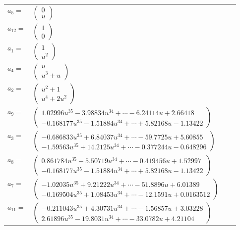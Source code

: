 \documentclass[1p]{elsarticle_modified}
\theoremstyle{definition}
\begin{document}
\begin{tabular}{m{7pt} m{180pt} m{7pt} m{180pt} }
\flushright $a_{5}=$&$\begin{pmatrix}0\\u\end{pmatrix}$ \\
\flushright $a_{12}=$&$\begin{pmatrix}1\\0\end{pmatrix}$ \\
\flushright $a_{1}=$&$\begin{pmatrix}1\\u^2\end{pmatrix}$ \\
\flushright $a_{4}=$&$\begin{pmatrix}u\\u^3+u\end{pmatrix}$ \\
\flushright $a_{2}=$&$\begin{pmatrix}u^2+1\\u^4+2 u^2\end{pmatrix}$ \\
\flushright $a_{9}=$&$\begin{pmatrix}1.02996 u^{35}-3.98834 u^{34}+\cdots-6.24114 u+2.66418\\-0.168177 u^{35}-1.51884 u^{34}+\cdots+5.82168 u-1.13422\end{pmatrix}$ \\
\flushright $a_{3}=$&$\begin{pmatrix}-0.686833 u^{35}+6.84037 u^{34}+\cdots-59.7725 u+5.60855\\-1.59563 u^{35}+14.2125 u^{34}+\cdots-0.377244 u-0.648296\end{pmatrix}$ \\
\flushright $a_{8}=$&$\begin{pmatrix}0.861784 u^{35}-5.50719 u^{34}+\cdots-0.419456 u+1.52997\\-0.168177 u^{35}-1.51884 u^{34}+\cdots+5.82168 u-1.13422\end{pmatrix}$ \\
\flushright $a_{7}=$&$\begin{pmatrix}-1.02035 u^{35}+9.21222 u^{34}+\cdots-51.8896 u+6.01389\\-0.169504 u^{35}+1.08453 u^{34}+\cdots-12.1591 u+0.0163512\end{pmatrix}$ \\
\flushright $a_{11}=$&$\begin{pmatrix}-0.211043 u^{35}+4.30731 u^{34}+\cdots-1.56857 u+3.03228\\2.61896 u^{35}-19.8031 u^{34}+\cdots-33.0782 u+4.21104\end{pmatrix}$ \\

\end{tabular}
\end{document}
